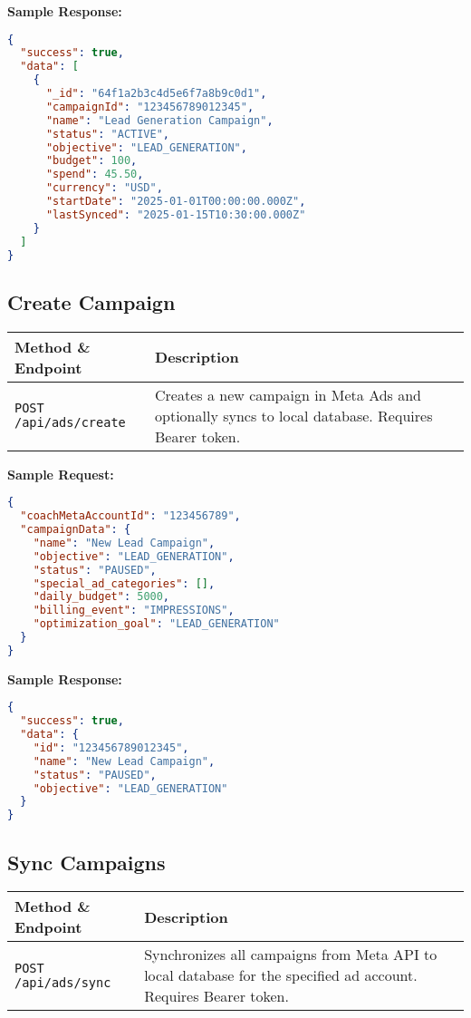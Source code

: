 \documentclass[11pt,a4paper]{article}
\begin{document}
\textbf{Sample Response:}
\begin{lstlisting}[language=json]
{
  "success": true,
  "data": [
    {
      "_id": "64f1a2b3c4d5e6f7a8b9c0d1",
      "campaignId": "123456789012345",
      "name": "Lead Generation Campaign",
      "status": "ACTIVE",
      "objective": "LEAD_GENERATION",
      "budget": 100,
      "spend": 45.50,
      "currency": "USD",
      "startDate": "2025-01-01T00:00:00.000Z",
      "lastSynced": "2025-01-15T10:30:00.000Z"
    }
  ]
}
\end{lstlisting}

\subsection{Create Campaign}
\begin{longtable}{L{3cm}Y}
\toprule
\textbf{Method \& Endpoint} & \textbf{Description} \\
\midrule
\texttt{POST /api/ads/create} & Creates a new campaign in Meta Ads and optionally syncs to local database. Requires Bearer token. \\
\bottomrule
\end{longtable}

\textbf{Sample Request:}
\begin{lstlisting}[language=json]
{
  "coachMetaAccountId": "123456789",
  "campaignData": {
    "name": "New Lead Campaign",
    "objective": "LEAD_GENERATION",
    "status": "PAUSED",
    "special_ad_categories": [],
    "daily_budget": 5000,
    "billing_event": "IMPRESSIONS",
    "optimization_goal": "LEAD_GENERATION"
  }
}
\end{lstlisting}

\textbf{Sample Response:}
\begin{lstlisting}[language=json]
{
  "success": true,
  "data": {
    "id": "123456789012345",
    "name": "New Lead Campaign",
    "status": "PAUSED",
    "objective": "LEAD_GENERATION"
  }
}
\end{lstlisting}

\subsection{Sync Campaigns}
\begin{longtable}{L{3cm}Y}
\toprule
\textbf{Method \& Endpoint} & \textbf{Description} \\
\midrule
\texttt{POST /api/ads/sync} & Synchronizes all campaigns from Meta API to local database for the specified ad account. Requires Bearer token. \\
\bottomrule
\end{longtable}
\end{document}

